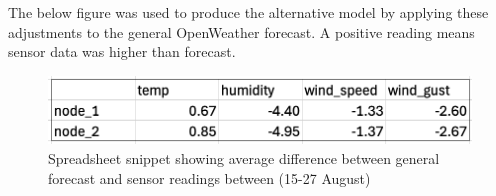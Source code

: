 The below figure was used to produce the alternative model by applying these
adjustments to the general OpenWeather forecast. A positive reading means sensor
data was higher than forecast.

\begin{figure}[H]
    \centering
    \includegraphics[width=1\textwidth]{contents/appendix/fig5/average-difference.png}
    \caption{Spreadsheet snippet showing average difference between general forecast and sensor readings between (15-27 August)}
    \label{fig:alt-data-ig}
\end{figure} 